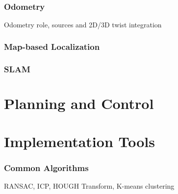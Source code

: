 \documentclass[a4paper,11pt]{article}
\begin{document}
\newpage
\section{Odometry}
Odometry role, sources and 2D/3D twist integration

\newpage
\section{Map-based Localization}

\newpage
\section{SLAM}



\newpage
\part{Planning and Control}

\newpage



\newpage
\part{Implementation Tools}
\newpage
\section{Common Algorithms}
RANSAC, ICP, HOUGH Transform, K-means clustering

\newpage


\end{document}
